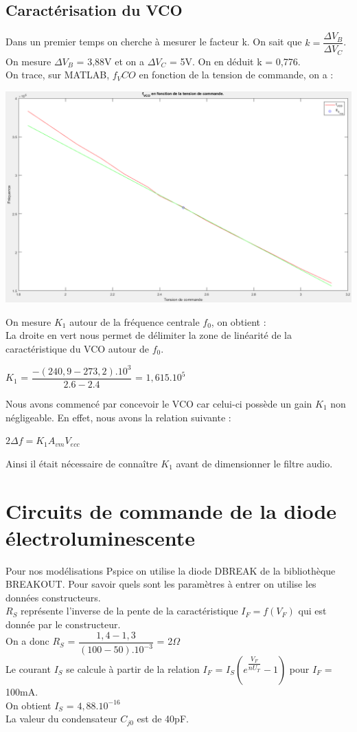 \documentclass[a4paper]{report}
\begin{document}
\subsection{Caractérisation du VCO}
Dans un premier temps on cherche à mesurer le facteur k. On sait que $k=\dfrac{\Delta V_B}{\Delta V_C}$.
On mesure $\Delta V_B$ = 3,88V et on a $\Delta V_C$ = 5V. On en déduit k = 0,776.\\
On trace, sur MATLAB, $f_VCO$ en fonction de la tension de commande, on a : \\
\begin{center}
\includegraphics[width=1\textwidth]{fvco.PNG}
\end{center}
On mesure $K_1$ autour de la fréquence centrale $f_0$, on obtient : \\
La droite en vert nous permet de délimiter la zone de linéarité de la caractéristique du VCO autour de $f_0$.
\begin{center}
$K_1$ = $\dfrac{-(240,9-273,2).10^3}{2.6-2.4}$ = $1,615.10^5$\\
\end{center}
Nous avons commencé par concevoir le VCO car celui-ci possède un gain $K_1$ non négligeable. En effet, nous avons la relation suivante : \\
\begin{center}
$2\Delta f = K_1 A_{vm} V_{ecc}$
\end{center}
Ainsi il était nécessaire de connaître $K_1$ avant de dimensionner le filtre audio.\\
\section{Circuits de commande de la diode électroluminescente}
Pour nos modélisations Pspice on utilise la diode DBREAK de la bibliothèque BREAKOUT. Pour savoir quels sont les paramètres à entrer on utilise les données constructeurs.\\
$R_S$ représente l'inverse de la pente de la caractéristique $I_F=f(V_F)$ qui est donnée par le constructeur.\\ On a donc $R_S$ = $\dfrac{1,4 - 1,3}{(100-50).10^{-3}}$ = 2$\Omega$\\
Le courant $I_S$ se calcule à partir de la relation $I_F$ = $I_S(e^{\dfrac{V_F}{nU_T}}-1)$ pour $I_F$ = 100mA.\\ On obtient $I_S$ = $4,88.10^{-16}$\\
La valeur du condensateur $C_{j0}$ est de 40pF.
\end{document}
